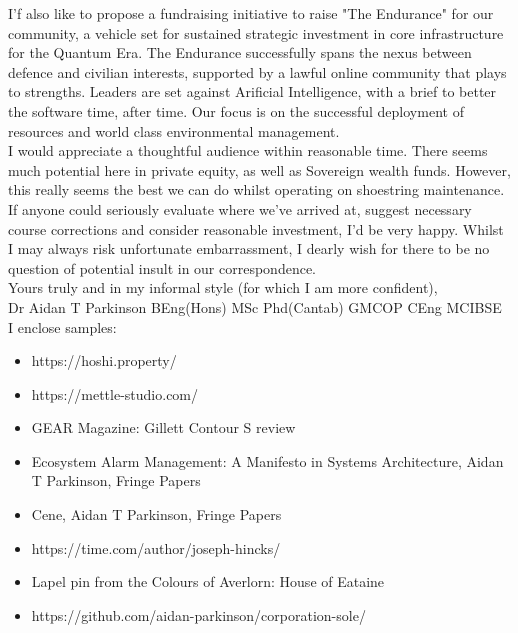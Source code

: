 \documentclass[11pt, oneside]{article}   	%
\begin{document}
I'f also like to propose a fundraising initiative to raise "The Endurance" for our community, a vehicle set for sustained strategic investment in core infrastructure for the Quantum Era.
The Endurance successfully spans the nexus between defence and civilian interests, supported by a lawful online community that plays to strengths.
Leaders are set against Arificial Intelligence, with a brief to better the software time, after time.
Our focus is on the successful deployment of resources and world class environmental management.\\

I would appreciate a thoughtful audience within reasonable time.
There seems much potential here in private equity, as well as Sovereign wealth funds.
However, this really seems the best we can do whilst operating on shoestring maintenance.
If anyone could seriously evaluate where we've arrived at, suggest necessary course corrections and consider reasonable investment, I'd be very happy.
Whilst I may always risk unfortunate embarrassment, I dearly wish for there to be no question of potential insult in our correspondence.\\

Yours truly and in my informal style (for which I am more confident),\\

Dr Aidan T Parkinson BEng(Hons) MSc Phd(Cantab) GMCOP CEng MCIBSE\\

I enclose samples:
\begin{itemize}
\item https://hoshi.property/
\item https://mettle-studio.com/
\item GEAR Magazine: Gillett Contour S review
\item Ecosystem Alarm Management: A Manifesto in Systems Architecture, Aidan T Parkinson, Fringe Papers
\item Cene, Aidan T Parkinson, Fringe Papers
\item https://time.com/author/joseph-hincks/
\item Lapel pin from the Colours of Averlorn: House of Eataine
\item https://github.com/aidan-parkinson/corporation-sole/
\end{itemize}
\end{document}
